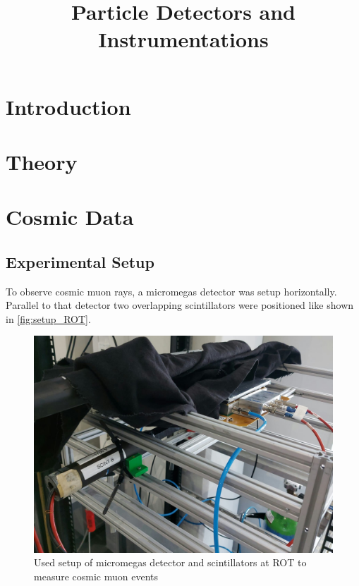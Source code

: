 \documentclass[sn-mathphys-num,iicol]{sn-jnl}
\theoremstyle{thmstyleone}
\theoremstyle{thmstyletwo}
\theoremstyle{thmstylethree}
\begin{document}
        
\title[]{Particle Detectors and Instrumentations}
\author*[1]{ }
\author*[1]{ }

\maketitle

\section{Introduction}

\section{Theory}

\section{Cosmic Data}
\subsection{Experimental Setup}
To observe cosmic muon rays, a micromegas detector was setup horizontally. Parallel to that detector two overlapping scintillators were positioned like shown in \autoref{fig:setup_ROT}.

\begin{figure}
  \includegraphics[width=\linewidth]{figures/setup_ROT.jpeg}
  \caption{Used setup of micromegas detector and scintillators at ROT to measure cosmic muon events}
  \label{fig:setup_ROT}
\end{figure}
\end{document}
